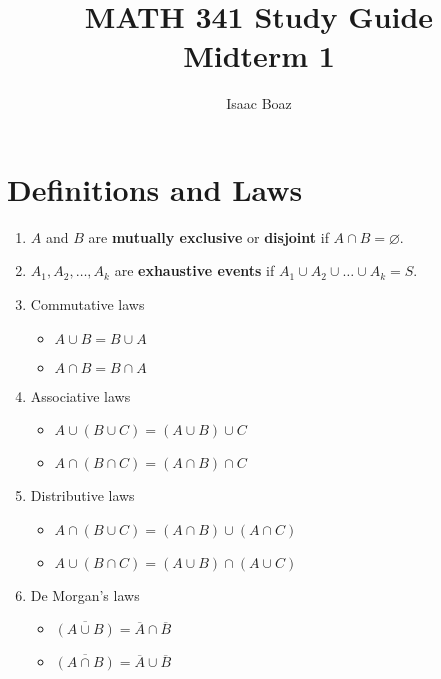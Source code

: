 \documentclass{article}
\title{\vspace{-5ex}MATH 341 Study Guide \\ Midterm 1}
\author{Isaac Boaz}
\begin{document}
\maketitle

\section*{Definitions and Laws}
\begin{enumerate}[noitemsep]
    \item \(A\) and \(B\) are \textbf{mutually exclusive} or \textbf{disjoint} if \(A \cap B = \varnothing\).
    \item \(A_1, A_2, \dots, A_k\) are \textbf{exhaustive events} if \(A_1 \cup A_2 \cup \dots \cup A_k = S\).
    \item Commutative laws
          \begin{itemize}
              \item \(A \cup B = B \cup A\)
              \item \(A \cap B = B \cap A\)
          \end{itemize}
    \item Associative laws
          \begin{itemize}
              \item \(A \cup (B \cup C) = (A \cup B) \cup C\)
              \item \(A \cap (B \cap C) = (A \cap B) \cap C\)
          \end{itemize}
    \item Distributive laws
          \begin{itemize}
              \item \(A \cap (B \cup C) = (A \cap B) \cup (A \cap C)\)
              \item \(A \cup (B \cap C) = (A \cup B) \cap (A \cup C)\)
          \end{itemize}
    \item De Morgan's laws
          \begin{itemize}
              \item \(\overline{(A \cup B)} = \overline{A} \cap \overline{B}\)
              \item \(\overline{(A \cap B)} = \overline{A} \cup \overline{B}\)
          \end{itemize}
\end{enumerate}
\end{document}
